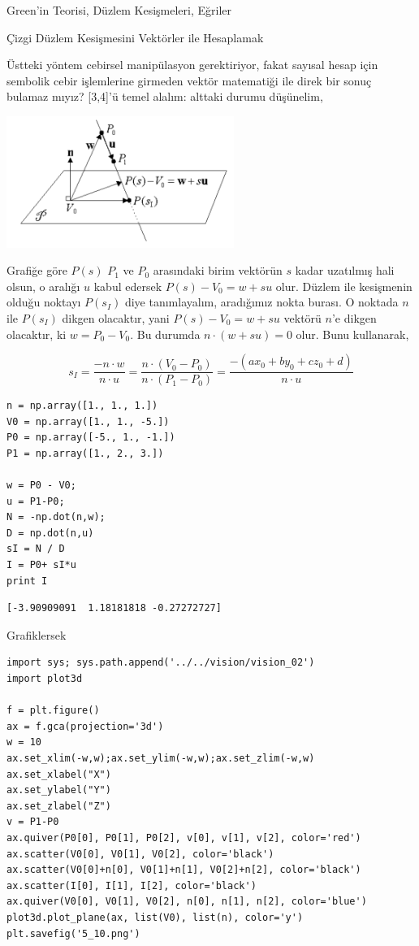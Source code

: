 \documentclass[12pt,fleqn]{article}\usepackage{../../common}
\begin{document}
Green'in Teorisi, Düzlem Kesişmeleri, Eğriler

Çizgi Düzlem Kesişmesini Vektörler ile Hesaplamak

Üstteki yöntem cebirsel manipülasyon gerektiriyor, fakat sayısal hesap için
sembolik cebir işlemlerine girmeden vektör matematiği ile direk bir sonuç
bulamaz mıyız? [3,4]'ü temel alalım: alttaki durumu düşünelim, 

\includegraphics[width=20em]{5_9.png}

Grafiğe göre $P(s)$ $P_1$ ve $P_0$ arasındaki birim vektörün $s$ kadar
uzatılmış hali olsun, o aralığı $u$ kabul edersek $P(s)-V_0 = w + su$
olur. Düzlem ile kesişmenin olduğu noktayı $P(s_I)$ diye tanımlayalım,
aradığımız nokta burası. O noktada $n$ ile $P(s_I)$ dikgen olacaktır, yani
$P(s) - V_0 = w + su$ vektörü $n$'e dikgen olacaktır, ki $w=P_0-V_0$. Bu
durumda $n \cdot (w+su) = 0$ olur. Bunu kullanarak,

$$ s_I = \frac{-n \cdot w}{n \cdot u} = 
\frac{n \cdot (V_0 - P_0)}{n \cdot (P_1-P_0)} = 
\frac{-(ax_0 + by_0 + cz_0 + d)}{n \cdot u}
$$

\begin{verbatim}
n = np.array([1., 1., 1.])
V0 = np.array([1., 1., -5.])
P0 = np.array([-5., 1., -1.])
P1 = np.array([1., 2., 3.])

w = P0 - V0;
u = P1-P0;
N = -np.dot(n,w);
D = np.dot(n,u)
sI = N / D
I = P0+ sI*u
print I
\end{verbatim}

\begin{verbatim}
[-3.90909091  1.18181818 -0.27272727]
\end{verbatim}

Grafiklersek

\begin{verbatim}
import sys; sys.path.append('../../vision/vision_02')
import plot3d

f = plt.figure()
ax = f.gca(projection='3d')
w = 10
ax.set_xlim(-w,w);ax.set_ylim(-w,w);ax.set_zlim(-w,w)
ax.set_xlabel("X")
ax.set_ylabel("Y")
ax.set_zlabel("Z")
v = P1-P0
ax.quiver(P0[0], P0[1], P0[2], v[0], v[1], v[2], color='red')
ax.scatter(V0[0], V0[1], V0[2], color='black')
ax.scatter(V0[0]+n[0], V0[1]+n[1], V0[2]+n[2], color='black')
ax.scatter(I[0], I[1], I[2], color='black')
ax.quiver(V0[0], V0[1], V0[2], n[0], n[1], n[2], color='blue')
plot3d.plot_plane(ax, list(V0), list(n), color='y')
plt.savefig('5_10.png')
\end{verbatim}
\end{document}
